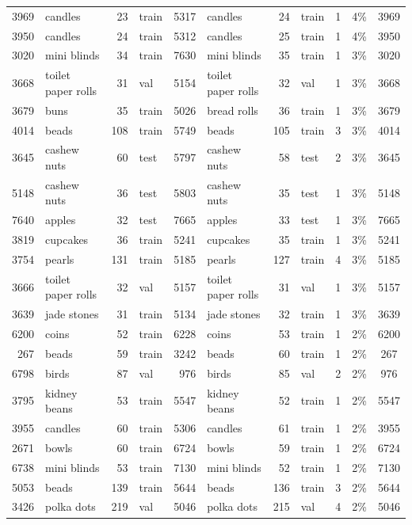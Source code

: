 \begin{tabular}{rlrlrlrlrrc}
3969 & candles & 23 & train & 5317 & candles & 24 & train & 1 &4\% & 3969\\
3950 & candles & 24 & train & 5312 & candles & 25 & train & 1 &4\% & 3950\\
3020 & mini blinds & 34 & train & 7630 & mini blinds & 35 & train & 1 &3\% & 3020\\
3668 & toilet paper rolls & 31 & val & 5154 & toilet paper rolls & 32 & val & 1 &3\% & 3668\\
3679 & buns & 35 & train & 5026 & bread rolls & 36 & train & 1 &3\% & 3679\\
4014 & beads & 108 & train & 5749 & beads & 105 & train & 3 &3\% & 4014\\
3645 & cashew nuts & 60 & test & 5797 & cashew nuts & 58 & test & 2 &3\% & 3645\\
5148 & cashew nuts & 36 & test & 5803 & cashew nuts & 35 & test & 1 &3\% & 5148\\
7640 & apples & 32 & test & 7665 & apples & 33 & test & 1 &3\% & 7665\\
3819 & cupcakes & 36 & train & 5241 & cupcakes & 35 & train & 1 &3\% & 5241\\
3754 & pearls & 131 & train & 5185 & pearls & 127 & train & 4 &3\% & 5185\\
3666 & toilet paper rolls & 32 & val & 5157 & toilet paper rolls & 31 & val & 1 &3\% & 5157\\
3639 & jade stones & 31 & train & 5134 & jade stones & 32 & train & 1 &3\% & 3639\\
6200 & coins & 52 & train & 6228 & coins & 53 & train & 1 &2\% & 6200\\
267 & beads & 59 & train & 3242 & beads & 60 & train & 1 &2\% & 267\\
6798 & birds & 87 & val & 976 & birds & 85 & val & 2 &2\% & 976\\
3795 & kidney beans & 53 & train & 5547 & kidney beans & 52 & train & 1 &2\% & 5547\\
3955 & candles & 60 & train & 5306 & candles & 61 & train & 1 &2\% & 3955\\
2671 & bowls & 60 & train & 6724 & bowls & 59 & train & 1 &2\% & 6724\\
6738 & mini blinds & 53 & train & 7130 & mini blinds & 52 & train & 1 &2\% & 7130\\
5053 & beads & 139 & train & 5644 & beads & 136 & train & 3 &2\% & 5644\\
3426 & polka dots & 219 & val & 5046 & polka dots & 215 & val & 4 &2\% & 5046\\

\end{tabular}
